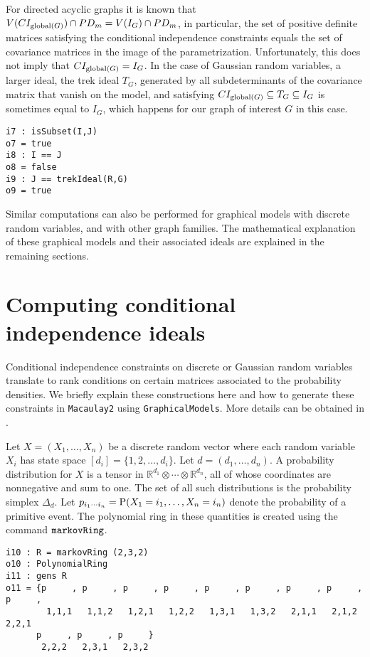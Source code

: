 \documentclass[letterpaper]{article}
\theoremstyle{definition}
\begin{document}
For directed acyclic graphs it is known that 
$V(CI_{{\rm global}(G)}) \cap PD_{m}  =  
V(I_{G}) \cap PD_{m}$,
in particular, the set of positive definite matrices
satisfying the conditional independence constraints equals the set of covariance matrices in the image of the parametrization.
Unfortunately, this does not imply that $CI_{{\rm global}(G)} 
=I_{G}$.  In the case of Gaussian random variables, a larger ideal,
the trek ideal $T_{G}$, generated by all subdeterminants of the 
covariance matrix that vanish on the model, and satisfying
$CI_{{\rm global}(G)} \subseteq T_{G} \subseteq
I_{G}$ is sometimes equal to $I_{G}$, which happens for our
graph of interest $G$ in this case.

\begin{verbatim}
i7 : isSubset(I,J)
o7 = true
i8 : I == J
o8 = false
i9 : J == trekIdeal(R,G)
o9 = true
\end{verbatim}

Similar computations can also be performed for graphical models
with discrete random variables,
and with other graph families.  The mathematical explanation of
these graphical models and their associated ideals
are explained in the remaining sections.


\section{Computing conditional independence ideals}

Conditional independence constraints on discrete or Gaussian random variables translate to rank conditions on certain matrices
associated to the probability densities.  We briefly explain
these constructions here and how to generate these constraints
in {\tt Macaulay2} using {\tt GraphicalModels}.  More details
can be obtained in \cite[Ch.~3]{DSS}.

Let $X = (X_{1}, \ldots, X_{n})$ be a discrete random
vector where each random variable $X_{i}$ has state space
$[d_{i}] = \{1,2, \ldots, d_{i} \}$. Let $d = (d_{1}, \ldots, d_{n})$.  
A probability distribution
for $X$ is a tensor in $\mathbb{R}^{d_{1}}\otimes \cdots \otimes \mathbb{R}^{d_{n}}$, all of whose coordinates are nonnegative and sum to one.
The set of all such distributions is the probability simplex $\Delta_{d}$.
Let $p_{i_{1}\cdots i_{n}} = {\rm P}(X_{1} = i_{1}, \ldots, X_{n} = i_{n})$
denote the probability of a primitive event.  The polynomial
ring in these quantities is created using the command ${\tt markovRing}$.

\begin{verbatim}
i10 : R = markovRing (2,3,2)
o10 : PolynomialRing
i11 : gens R
o11 = {p     , p     , p     , p     , p     , p     , p     , p     , p     ,
        1,1,1   1,1,2   1,2,1   1,2,2   1,3,1   1,3,2   2,1,1   2,1,2   2,2,1 
      p     , p     , p     }
       2,2,2   2,3,1   2,3,2
\end{verbatim}
\end{document}
